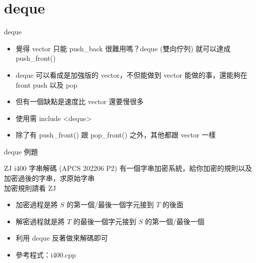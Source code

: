 \documentclass[aspectratio=169]{beamer}
\begin{document}
    \section{deque}

    \begin{frame}{deque}
        \begin{itemize}
            \item<1-> 覺得 vector 只能 push\_back 很難用嗎？deque (雙向佇列) 就可以達成 push\_front()
            \item<2-> deque 可以看成是加強版的 vector，不但能做到 vector 能做的事，還能夠在 front push 以及 pop
            \item<2-> 但有一個缺點是速度比 vector 還要慢很多
            \item<2-> 使用需 include <deque>
            \item<3-> 除了有 push\_front() 跟 pop\_front() 之外，其他都跟 vector 一樣
        \end{itemize}
    \end{frame}

    \begin{frame}{deque 例題}
        \begin{block}{ZJ i400 字串解碼 (APCS 202206 P2)}
            有一個字串加密系統，給你加密的規則以及加密過後的字串，求原始字串\\
            加密規則請看 ZJ
        \end{block}

        \begin{itemize}
            \item<2-> 加密過程是將 $S$ 的第一個/最後一個字元接到 $T$ 的後面
            \item<3-> 解密過程就是將 $T$ 的最後一個字元接到 $S$ 的第一個/最後一個
            \item<4-> 利用 deque 反著做來解碼即可
            \item<4-> 參考程式：i400.cpp
        \end{itemize}
    \end{frame}
\end{document}
